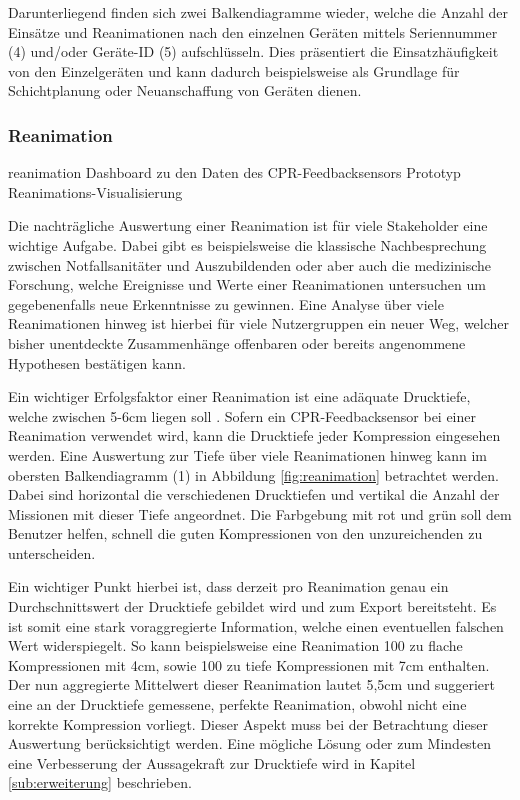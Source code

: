 Darunterliegend finden sich zwei Balkendiagramme wieder, welche die Anzahl der Einsätze und Reanimationen nach den einzelnen Geräten mittels Seriennummer (4) und/oder Geräte-ID (5) aufschlüsseln.
Dies präsentiert die Einsatzhäufigkeit von den Einzelgeräten und kann dadurch beispielsweise als Grundlage für Schichtplanung oder Neuanschaffung von Geräten dienen.

\subsubsection{Reanimation}
\label{subsub:reanimation}
\bildbreit
{reanimation}
{Dashboard zu den Daten des \gls{CPR-Feedbacksensor}s}
{Prototyp Reanimations-Visualisierung}

Die nachträgliche Auswertung einer Reanimation ist für viele Stakeholder eine wichtige Aufgabe.
Dabei gibt es beispielsweise die klassische Nachbesprechung zwischen Notfallsanitäter und Auszubildenden oder aber auch die medizinische Forschung, welche Ereignisse und Werte einer Reanimationen untersuchen um gegebenenfalls neue Erkenntnisse zu gewinnen.
Eine Analyse über viele Reanimationen hinweg ist hierbei für viele Nutzergruppen ein neuer Weg, welcher bisher unentdeckte Zusammenhänge offenbaren oder bereits angenommene Hypothesen bestätigen kann.

Ein wichtiger Erfolgsfaktor einer Reanimation ist eine adäquate Drucktiefe, welche zwischen 5-6cm liegen soll  \cite{Monsieurs.2015}.
Sofern ein \gls{CPR-Feedbacksensor} bei einer Reanimation verwendet wird, kann die Drucktiefe jeder Kompression eingesehen werden. %
Eine Auswertung zur Tiefe über viele Reanimationen hinweg kann im obersten Balkendiagramm (1) in Abbildung \ref{fig:reanimation} betrachtet werden.
Dabei sind horizontal die verschiedenen Drucktiefen und vertikal die Anzahl der Missionen mit dieser Tiefe angeordnet.
Die Farbgebung mit rot und grün soll dem Benutzer helfen, schnell die \glqq guten\grqq{} Kompressionen von den unzureichenden zu unterscheiden.

Ein wichtiger Punkt hierbei ist, dass derzeit pro Reanimation genau ein Durchschnittswert der Drucktiefe gebildet wird und zum Export bereitsteht.
Es ist somit eine stark voraggregierte Information, welche einen eventuellen falschen Wert widerspiegelt. 
So kann beispielsweise eine Reanimation 100 zu flache Kompressionen mit 4cm, sowie 100 zu tiefe Kompressionen  mit 7cm enthalten.
Der nun aggregierte Mittelwert dieser Reanimation lautet 5,5cm und suggeriert eine an der Drucktiefe gemessene, \glqq perfekte\grqq{} Reanimation, obwohl nicht eine korrekte Kompression vorliegt.
Dieser Aspekt muss bei der Betrachtung dieser Auswertung berücksichtigt werden.
Eine mögliche Lösung oder zum Mindesten eine Verbesserung der Aussagekraft zur Drucktiefe wird in Kapitel \ref{sub:erweiterung} beschrieben.

